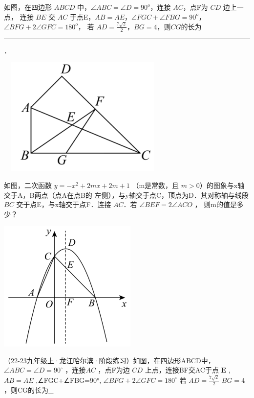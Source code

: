 \documentclass[12pt, a4paper, addpoints]{exam} %
\begin{document}
\vspace{10pt}



\begingroup{} %

\begin{questions}


\question[10] 如图，在四边形 $ABCD$ 中，$\angle{ABC}=\angle{D}=90^{o}$，连接 $AC$，点F为 $CD$ 边上一点，
连接 $BE$ 交 $AC$ 于点E，$AB=AE$，$\angle{FGC}+\angle{FBG}=90^{o}$，$\angle{BFG}+2\angle{GFC}=180^{o}$，
若 $AD=\frac{7\sqrt{2}}{2}$，$BG=4$，则$CG$的长为 \rule{3cm}{0.4pt}．

\ \ 
\includegraphics[scale=1]{2222.png}
\vspace{6cm}




\question[15] 如图，二次函数 $y=-x^2+2mx+2m+1 $ （m是常数，且 $m>0$）的图象与x轴交于A，B两点（点A在点B的
左侧），与y轴交于点C，顶点为D．其对称轴与线段 $BC$ 交于点E，与x轴交于点F．连接 $AC$．若 $\angle{BEF}=2\angle{ACO}$ ，
则m的值是多少？

\includegraphics[scale=1]{1111.png}
\vspace{6cm}


（22-23九年级上·龙江哈尔滨·阶段练习）如图，在四边形ABCD中，
$\angle A B C = \angle D = 9 0 ^ { \circ }$ ，连接$A C$ ，点F为边
$C D$ 上点，连接BF交AC于点 $\boldsymbol { E }$ , $A B = A E$
,∠FGC+∠FBG=90°, $\angle B F G + 2 \angle G F C = 1 8 0 ^ { \circ }$ 若
$AD=\frac{7\sqrt{2}} { 2 }$ $BG=4$ ，则CG的长为\_



\end{questions}
\endgroup
\end{document}
